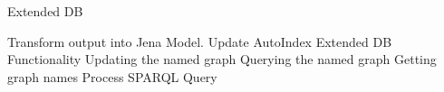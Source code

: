 \begin{frame}{Extended DB}
\begin{outline}
 \1 Transform output into Jena Model.
 \1 Update AutoIndex
   \1 Extended DB Functionality
     \2 Updating the named graph
     \2 Querying the named graph
     \2 Getting graph names
     \2 Process SPARQL Query
     
     
\end{outline}
\end{frame}




	